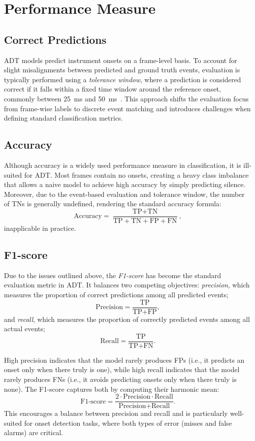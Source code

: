 \section{Performance Measure}

\subsection{Correct Predictions}

\gls{ADT} models predict instrument onsets on a frame-level basis. To account for slight misalignments between predicted and ground truth events, evaluation is typically performed using a \textit{tolerance window}, where a prediction is considered correct if it falls within a fixed time window around the reference onset, commonly between 25~ms and 50~ms~\cite{vogl2016recurrent}. This approach shifts the evaluation focus from frame-wise labels to discrete event matching and introduces challenges when defining standard classification metrics.

\subsection{Accuracy}

Although accuracy is a widely used performance measure in classification, it is ill-suited for \gls{ADT}. Most frames contain no onsets, creating a heavy class imbalance that allows a naive model to achieve high accuracy by simply predicting silence. Moreover, due to the event-based evaluation and tolerance window, the number of \glspl{TN} is generally undefined, rendering the standard accuracy formula:\[ \text{Accuracy} = \frac{\text{TP} + \text{TN}}{\text{TP} + \text{TN} + \text{FP} + \text{FN}},\] inapplicable in practice.

\subsection{F1-score}

Due to the issues outlined above, the \textit{F1-score} has become the standard evaluation metric in \gls{ADT}. It balances two competing objectives: \textit{precision}, which measures the proportion of correct predictions among all predicted events; \[ \text{Precision} = \frac{\text{TP}}{\text{TP} + \text{FP}},\] and \textit{recall}, which measures the proportion of correctly predicted events among all actual events; \[ \text{Recall} = \frac{\text{TP}}{\text{TP} + \text{FN}}. \]

High precision indicates that the model rarely produces \glspl{FP} (i.e., it predicts an onset only when there truly is one), while high recall indicates that the model rarely produces \glspl{FN} (i.e., it avoids predicting onsets only when there truly is none). The F1-score captures both by computing their harmonic mean: \[ \text{F1-score} = \frac{2 \cdot \text{Precision} \cdot \text{Recall}}{\text{Precision} + \text{Recall}}. \] This encourages a balance between precision and recall and is particularly well-suited for onset detection tasks, where both types of error (misses and false alarms) are critical.

